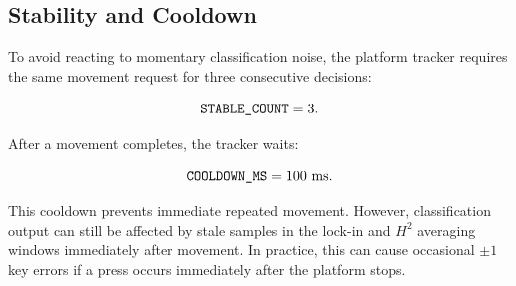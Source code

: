\subsection{Stability and Cooldown}

To avoid reacting to momentary classification noise, the platform tracker requires the same movement request for three consecutive decisions:

\begin{equation}
    \texttt{STABLE\_COUNT} = 3.
\end{equation}

After a movement completes, the tracker waits:

\begin{equation}
    \texttt{COOLDOWN\_MS} = 100~\mathrm{ms}.
\end{equation}

This cooldown prevents immediate repeated movement. However, classification output can still be affected by stale samples in the lock-in and $H^2$ averaging windows immediately after movement. In practice, this can cause occasional $\pm 1$ key errors if a press occurs immediately after the platform stops.

